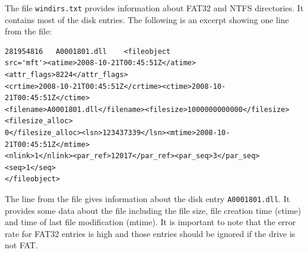 The file \texttt{windirs.txt} provides information about FAT32 and NTFS directories. It contains most of the disk entries. The following is an excerpt showing one line from the file:
\lstset{style=customfile}
\begin{lstlisting}
281954816	A0001801.dll	<fileobject
src='mft'><atime>2008-10-21T00:45:51Z</atime><attr_flags>8224</attr_flags>
<crtime>2008-10-21T00:45:51Z</crtime><ctime>2008-10-21T00:45:51Z</ctime>
<filename>A0001801.dll</filename><filesize>1000000000000</filesize><filesize_alloc>
0</filesize_alloc><lsn>123437339</lsn><mtime>2008-10-21T00:45:51Z</mtime>
<nlink>1</nlink><par_ref>12017</par_ref><par_seq>3</par_seq><seq>1</seq>
</fileobject>
\end{lstlisting}
The line from the file gives information about the disk entry \texttt{A0001801.dll}. It provides some data about the file including the file size, file creation time (ctime) and time of last file modification (mtime). It is important to note that the error rate for FAT32 entries is high and those entries should be ignored if the drive is not FAT. \\

